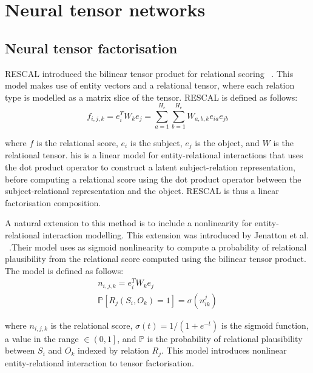 
\section{Neural tensor networks}

\subsection{Neural tensor factorisation}
RESCAL introduced the bilinear tensor product for relational scoring \unskip ~\citep{nickel2011three}. This model makes use of entity vectors and a relational tensor, where each relation type is modelled as a matrix slice of the tensor. RESCAL is defined as follows:
\begin{equation}
	f_{i, j, k} = e_i^TW_ke_j = \sum_{a=1}^{H_e}\sum_{b=1}^{H_e}W_{a,b,k}e_{ia}e_{jb}
\end{equation}

\noindent where $f$ is the relational score, $e_i$ is the subject, $e_j$ is the object, and $W$ is the relational tensor. his is a linear model for entity-relational interactions that uses the dot product operator to construct a latent subject-relation representation, before computing a relational score using the dot product operator between the subject-relational representation and the object. RESCAL is thus a linear factorisation composition. \par

\noindent A natural extension to this method is to include a nonlinearity for entity-relational interaction modelling. This extension was introduced by Jenatton et al. \unskip ~\citep{jenatton2012latent}.Their model uses as sigmoid nonlinearity to compute a probability of relational plausibility from the relational score computed using the bilinear tensor product. The model is defined as follows:
\begin{subequations}
	\begin{gather}
		n_{i,j,k} = e_i^TW_ke_j \\
		\mathbb{P}\left [ R_j(S_i, O_k) = 1 \right ] = \sigma(n_{ik}^{j})
	\end{gather}
\end{subequations}

\noindent where $ n_{i,j,k} $ is the relational score, $ \sigma(t) = 1/(1 + e^{-t}) $ is the sigmoid function, a value in the range $\in \left ( 0, 1 \right ]$, and $\mathbb{P}$ is the probability of relational plausibility between $ S_i $ and $ O_k $ indexed by relation $ R_j $. This model introduces nonlinear entity-relational interaction to tensor factorisation. 

